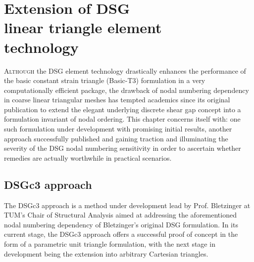 



\chapter[Extension of DSG linear triangle element technology]{Extension of DSG \\ linear triangle element \\ technology}
\label{chap:chapter_dsg_extension}

\renewcommand{\Thema}{Extension of DSG linear triangle element technology}

\lettrine[lines=2]{A}{lthough} the DSG element technology drastically enhances the performance of the basic constant strain triangle (Basic-T3) formulation in a very computationally efficient package, the drawback of nodal numbering dependency in coarse linear triangular meshes has tempted academics since its original publication to extend the elegant underlying discrete shear gap concept into a formulation invariant of nodal ordering. This chapter concerns itself with: one such formulation under development with promising initial results, another approach successfully published and gaining traction and illuminating the severity of the DSG nodal numbering sensitivity in order to ascertain whether remedies are actually worthwhile in practical scenarios.

\section{DSGc3 approach}
The DSGc3 approach is a method under development lead by Prof. Bletzinger at TUM's Chair of Structural Analysis aimed at addressing the aforementioned nodal numbering dependency of Bletzinger's original DSG formulation. In its current stage, the DSGc3 approach offers a successful proof of concept in the form of a parametric unit triangle formulation, with the next stage in development being the extension into arbitrary Cartesian triangles. 

